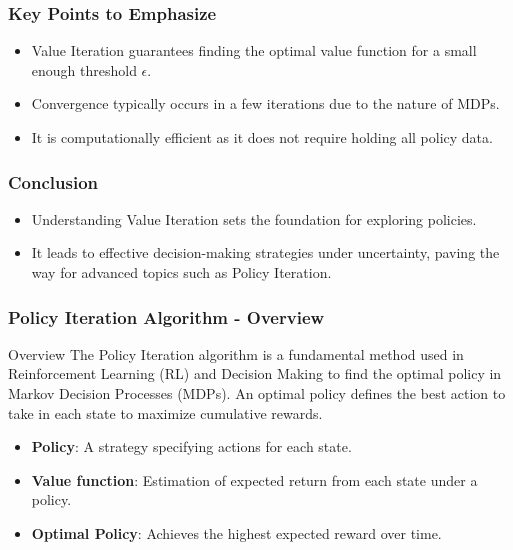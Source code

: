 \documentclass{beamer}
\begin{document}
\begin{frame}[fragile]
    \frametitle{Key Points to Emphasize}
    \begin{itemize}
        \item Value Iteration guarantees finding the optimal value function for a small enough threshold $\epsilon$.
        \item Convergence typically occurs in a few iterations due to the nature of MDPs.
        \item It is computationally efficient as it does not require holding all policy data.
    \end{itemize}
\end{frame}

\begin{frame}[fragile]
    \frametitle{Conclusion}
    \begin{itemize}
        \item Understanding Value Iteration sets the foundation for exploring policies.
        \item It leads to effective decision-making strategies under uncertainty, paving the way for advanced topics such as Policy Iteration.
    \end{itemize}
\end{frame}

\begin{frame}[fragile]
    \frametitle{Policy Iteration Algorithm - Overview}
    \begin{block}{Overview}
        The Policy Iteration algorithm is a fundamental method used in Reinforcement Learning (RL) and Decision Making to find the optimal policy in Markov Decision Processes (MDPs). An optimal policy defines the best action to take in each state to maximize cumulative rewards.
    \end{block}
    
    \begin{itemize}
        \item \textbf{Policy}: A strategy specifying actions for each state.
        \item \textbf{Value function}: Estimation of expected return from each state under a policy.
        \item \textbf{Optimal Policy}: Achieves the highest expected reward over time.
    \end{itemize}
\end{frame}
\end{document}
